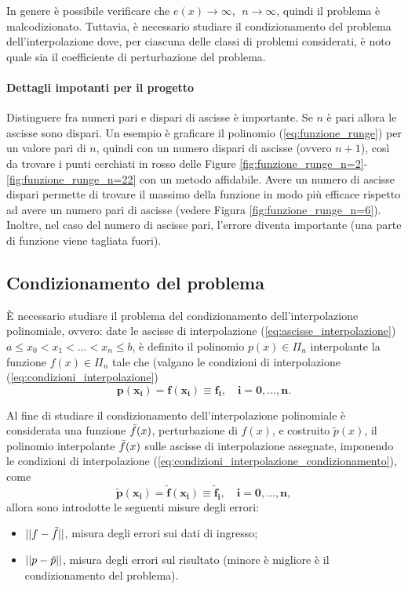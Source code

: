 In genere è possibile verificare che $e(x)\rightarrow\infty,\;\, n\rightarrow\infty$, quindi il problema è malcodizionato. Tuttavia, è necessario studiare il condizionamento del problema dell'interpolazione dove, per ciascuna delle classi di problemi considerati, è noto quale sia il coefficiente di perturbazione del problema.

\paragraph{Dettagli impotanti per il progetto} Distinguere fra numeri pari e dispari di ascisse è importante. Se $n$ è pari allora  le ascisse sono dispari. Un esempio è graficare il polinomio (\ref{eq:funzione_runge}) per un valore pari di $n$, quindi con un numero dispari di ascisse (ovvero $n+1$), così da trovare i punti cerchiati in rosso delle Figure \ref{fig:funzione_runge_n=2}-\ref{fig:funzione_runge_n=22} con un metodo affidabile.  Avere un numero di ascisse dispari permette di trovare il massimo della funzione in modo più efficace rispetto ad avere un numero pari di ascisse (vedere Figura \ref{fig:funzione_runge_n=6}). Inoltre, nel caso del numero di ascisse pari, l'errore diventa importante (una parte di funzione viene tagliata fuori).

\subsection{Condizionamento del problema}\label{ssec:condizionamento_problema_approsimazione_funzione}
È necessario studiare il problema del condizionamento dell'interpolazione polinomiale, ovvero: date le ascisse di interpolazione (\ref{eq:ascisse_interpolazione}) $a\leq x_0<x_1<\hdots<x_n\leq b$, è definito il polinomio $p(x)\in\Pi_n$ interpolante la funzione $f(x)\in\Pi_n$ tale che (valgano le condizioni di interpolazione (\ref{eq:condizioni_interpolazione})
\begin{equation}\label{eq:condizioni_interpolazione_condizionamento}
	\boldsymbol{p(x_i)=f(x_i)\equiv f_i},\quad\boldsymbol{i=0,\hdots,n}.
\end{equation}

Al fine di studiare il condizionamento dell'interpolazione polinomiale è considerata una funzione $\Tilde{f}(x)$, perturbazione di $f(x)$, e costruito $\tilde{p}(x)$, il polinomio interpolante $\Tilde{f}(x)$ sulle ascisse di interpolazione assegnate, imponendo le condizioni di interpolazione (\ref{eq:condizioni_interpolazione_condizionamento}), come
\begin{equation}\label{eq:polinomio_interpolante_perturbazione_f}
	\boldsymbol{\tilde{p}(x_i)=\tilde{f}(x_i)\equiv\tilde{f}_i,\quad i=0,\hdots,n},
\end{equation}
allora sono introdotte le seguenti misure degli errori:
\begin{itemize}
	\item $||f-\Tilde{f}||$, misura degli errori sui dati di ingresso;
	\item $||p-\Tilde{p}||$, misura degli errori sul risultato (minore è migliore è il condizionamento del problema).
\end{itemize}


